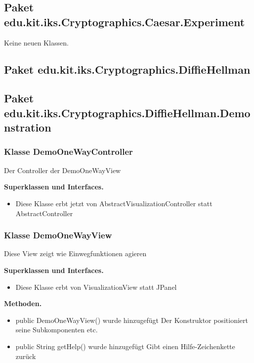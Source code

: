 \documentclass{article}
\begin{document}
  \subsection{Paket edu.kit.iks.Cryptographics.Caesar.Experiment}
   Keine neuen Klassen.
  \subsection{Paket edu.kit.iks.Cryptographics.DiffieHellman}
  
  \subsection{Paket edu.kit.iks.Cryptographics.DiffieHellman.Demonstration}

	\subsubsection{Klasse DemoOneWayController}
    Der Controller der DemoOneWayView\newline

	    \textbf{Superklassen und Interfaces.}\newline
	   \begin{itemize}
            \item Diese Klasse erbt jetzt von AbstractVisualizationController statt AbstractController\newline
           \end{itemize}

	\subsubsection{Klasse DemoOneWayView}
    Diese View zeigt wie Einwegfunktionen agieren\newline

	    \textbf{Superklassen und Interfaces.}\newline
	   \begin{itemize}
            \item Diese Klasse erbt von VisualizationView statt JPanel\newline
           \end{itemize}

    \textbf{Methoden.}\newline
	   \begin{itemize}
           \item public DemoOneWayView() wurde hinzugefügt\newline
               Der Konstruktor positioniert seine Subkomponenten etc.\newline
           \item public String getHelp() wurde hinzugefügt\newline
               Gibt einen Hilfe-Zeichenkette zurück\newline
           \end{itemize}
\end{document}
